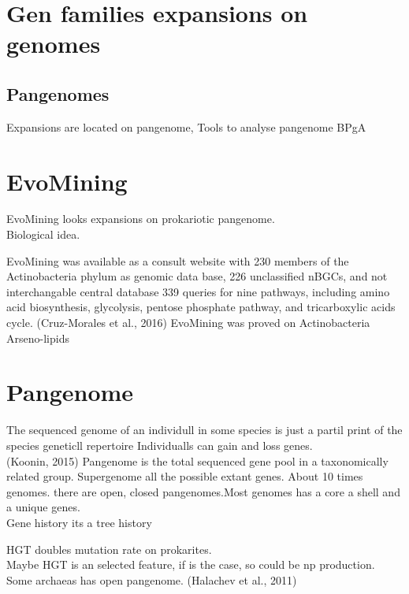 \documentclass[12pt,twoside]{reedthesis}
\begin{document}
  \section{Gen families expansions on
  genomes}\label{gen-families-expansions-on-genomes}
  
  \subsection{Pangenomes}\label{pangenomes}
  
  Expansions are located on pangenome, Tools to analyse pangenome BPgA
  
  \section{EvoMining}\label{evomining-1}
  
  EvoMining looks expansions on prokariotic pangenome.\\
  Biological idea.
  
  EvoMining was available as a consult website with 230 members of the
  Actinobacteria phylum as genomic data base, 226 unclassified nBGCs, and
  not interchangable central database 339 queries for nine pathways,
  including amino acid biosynthesis, glycolysis, pentose phosphate
  pathway, and tricarboxylic acids cycle. (Cruz-Morales et al., 2016)
  EvoMining was proved on Actinobacteria Arseno-lipids
  
  \section{Pangenome}\label{pangenome}
  
  The sequenced genome of an individull in some species is just a partil
  print of the species geneticll repertoire Individualls can gain and loss
  genes.\\
  (Koonin, 2015) Pangenome is the total sequenced gene pool in a
  taxonomically related group. Supergenome all the possible extant genes.
  About 10 times genomes. there are open, closed pangenomes.Most genomes
  has a core a shell and a unique genes.\\
  Gene history its a tree history
  
  HGT doubles mutation rate on prokarites.\\
  Maybe HGT is an selected feature, if is the case, so could be np
  production.\\
  Some archaeas has open pangenome. (Halachev et al., 2011)
  
\end{document}
